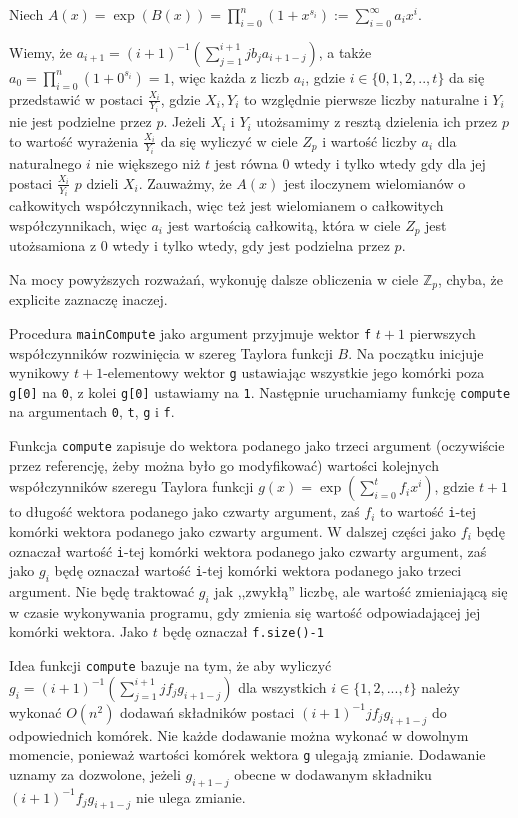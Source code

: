 \documentclass{article}
\begin{document}
Niech $A(x)=\exp(B(x))=\prod_{i=0}^n(1+x^{s_i}):=\sum_{i=0}^{\infty}a_ix^i$.

Wiemy, że $a_{i+1}=(i+1)^{-1}(\sum_{j=1}^{i+1}jb_ja_{i+1-j})$, a także $a_0=\prod_{i=0}^n(1+0^{s_i})=1$, więc każda
z liczb $a_i$, gdzie $i \in \{0,1,2,..,t \}$ da się przedstawić w postaci $\frac{X_i}{Y_i}$, gdzie $X_i,Y_i$ to
względnie pierwsze liczby naturalne i $Y_i$ nie jest podzielne przez $p$. Jeżeli $X_i$ i $Y_i$ utożsamimy z resztą dzielenia ich 
przez $p$ to wartość wyrażenia $\frac{X_i}{Y_i}$ da się wyliczyć w ciele $Z_p$ i wartość liczby $a_i$ dla naturalnego $i$
nie większego niż $t$ jest równa $0$ wtedy i tylko wtedy gdy dla jej postaci $\frac{X_i}{Y_i}$ $p$ dzieli $X_i$. Zauważmy,
że $A(x)$ jest iloczynem wielomianów o całkowitych współczynnikach, więc też jest wielomianem o całkowitych współczynnikach,
więc $a_i$ jest wartością całkowitą, która w ciele $Z_p$ jest utożsamiona z $0$ wtedy i tylko wtedy, gdy jest podzielna przez $p$.

Na mocy powyższych rozważań, wykonuję dalsze obliczenia w ciele $\mathbb{Z}_p$, chyba, że explicite zaznaczę inaczej.


Procedura \texttt{mainCompute} jako argument przyjmuje wektor \texttt{f} $t+1$ pierwszych współczynników rozwinięcia w 
szereg Taylora funkcji $B$. Na początku inicjuje wynikowy $t+1$-elementowy wektor \texttt{g} ustawiając wszystkie
jego komórki poza \texttt{g[0]} na \texttt{0}, z kolei \texttt{g[0]} ustawiamy na \texttt{1}. Następnie uruchamiamy funkcję 
\texttt{compute} na argumentach \texttt{0}, \texttt{t}, \texttt{g} i \texttt{f}.

Funkcja \texttt{compute} zapisuje do wektora podanego jako trzeci argument (oczywiście przez referencję, żeby 
można było go modyfikować) wartości kolejnych współczynników szeregu Taylora funkcji 
$g(x)=\exp(\sum_{i=0}^tf_ix^i)$, gdzie $t+1$ to długość wektora podanego jako czwarty argument, zaś
$f_i$ to wartość \texttt{i}-tej komórki wektora podanego jako czwarty argument. W dalszej części jako $f_i$ będę 
oznaczał wartość \texttt{i}-tej komórki wektora podanego jako czwarty argument, zaś jako $g_i$ będę oznaczał wartość 
\texttt{i}-tej komórki wektora podanego jako trzeci argument. Nie będę traktować $g_i$ jak ,,zwykłą''
liczbę, ale wartość zmieniającą się w czasie wykonywania programu, gdy zmienia się wartość odpowiadającej jej
komórki wektora.
Jako $t$ będę oznaczał \texttt{f.size()-1}

Idea funkcji \texttt{compute} bazuje na tym, że aby wyliczyć $g_i=(i+1)^{-1}(\sum_{j=1}^{i+1}jf_jg_{i+1-j})$ dla wszystkich $i \in \{1,2,...,t\}$ należy
wykonać $O(n^2)$ dodawań składników postaci $(i+1)^{-1}jf_jg_{i+1-j}$ do odpowiednich komórek. Nie każde dodawanie można wykonać w dowolnym
momencie, ponieważ wartości komórek wektora \texttt{g} ulegają zmianie. Dodawanie uznamy za dozwolone, jeżeli $g_{i+1-j}$ obecne w 
dodawanym składniku $(i+1)^{-1}f_jg_{i+1-j}$ nie ulega zmianie. 
\end{document}
